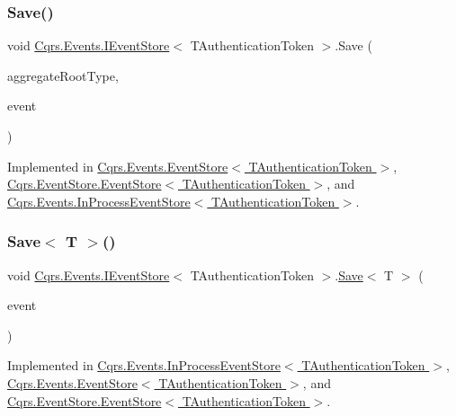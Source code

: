 \subsubsection{\texorpdfstring{Save()}{Save()}}
{\footnotesize\ttfamily void \hyperlink{interfaceCqrs_1_1Events_1_1IEventStore}{Cqrs.\+Events.\+I\+Event\+Store}$<$ T\+Authentication\+Token $>$.Save (\begin{DoxyParamCaption}\item[{Type}]{aggregate\+Root\+Type,  }\item[{\hyperlink{interfaceCqrs_1_1Events_1_1IEvent}{I\+Event}$<$ T\+Authentication\+Token $>$ @}]{event }\end{DoxyParamCaption})}



Implemented in \hyperlink{classCqrs_1_1Events_1_1EventStore_a3ba5ba04a36382b6d36a6ad8867dc766_a3ba5ba04a36382b6d36a6ad8867dc766}{Cqrs.\+Events.\+Event\+Store$<$ T\+Authentication\+Token $>$}, \hyperlink{classCqrs_1_1EventStore_1_1EventStore_adce33037e2a3eb81cfccded42ba2ed35_adce33037e2a3eb81cfccded42ba2ed35}{Cqrs.\+Event\+Store.\+Event\+Store$<$ T\+Authentication\+Token $>$}, and \hyperlink{classCqrs_1_1Events_1_1InProcessEventStore_a93e6d7dc5b81ffba6a89cf22b273d0c9_a93e6d7dc5b81ffba6a89cf22b273d0c9}{Cqrs.\+Events.\+In\+Process\+Event\+Store$<$ T\+Authentication\+Token $>$}.

\mbox{\label{interfaceCqrs_1_1Events_1_1IEventStore_a92e768243d6602d09b786bbd06811ce6_a92e768243d6602d09b786bbd06811ce6}} 
\subsubsection{\texorpdfstring{Save$<$ T $>$()}{Save< T >()}}
{\footnotesize\ttfamily void \hyperlink{interfaceCqrs_1_1Events_1_1IEventStore}{Cqrs.\+Events.\+I\+Event\+Store}$<$ T\+Authentication\+Token $>$.\hyperlink{interfaceCqrs_1_1Events_1_1IEventStore_a81fb586703e7c6dea6b23d9a95f3887a_a81fb586703e7c6dea6b23d9a95f3887a}{Save}$<$ T $>$ (\begin{DoxyParamCaption}\item[{\hyperlink{interfaceCqrs_1_1Events_1_1IEvent}{I\+Event}$<$ T\+Authentication\+Token $>$ @}]{event }\end{DoxyParamCaption})}



Implemented in \hyperlink{classCqrs_1_1Events_1_1InProcessEventStore_ace191a5083a6ddd308dbbc302dc5bd8e_ace191a5083a6ddd308dbbc302dc5bd8e}{Cqrs.\+Events.\+In\+Process\+Event\+Store$<$ T\+Authentication\+Token $>$}, \hyperlink{classCqrs_1_1Events_1_1EventStore_a958854f49c3eb4fcf1922ba7737a8dfe_a958854f49c3eb4fcf1922ba7737a8dfe}{Cqrs.\+Events.\+Event\+Store$<$ T\+Authentication\+Token $>$}, and \hyperlink{classCqrs_1_1EventStore_1_1EventStore_a7261e5b74f55ef7afd23144c155ba116_a7261e5b74f55ef7afd23144c155ba116}{Cqrs.\+Event\+Store.\+Event\+Store$<$ T\+Authentication\+Token $>$}.

